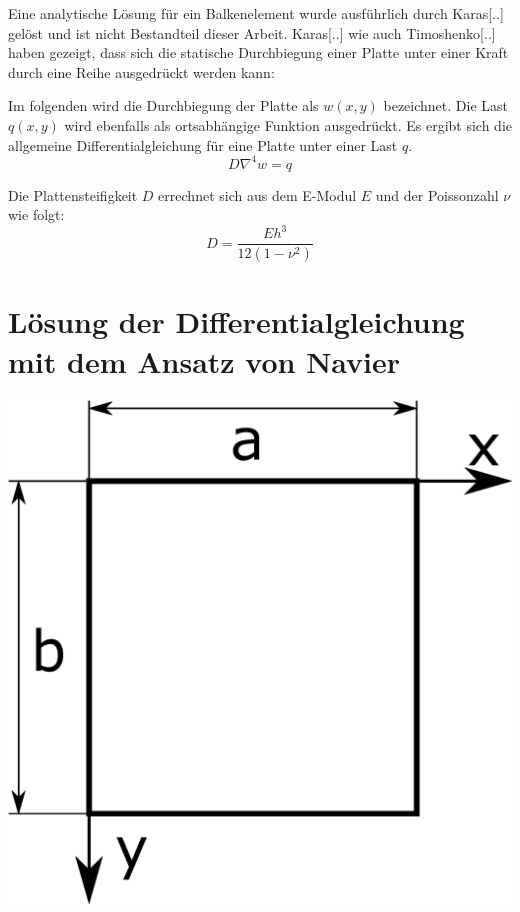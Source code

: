 Eine analytische Lösung für ein Balkenelement wurde ausführlich durch Karas[..] gelöst und ist nicht Bestandteil dieser Arbeit.
Karas[..] wie auch Timoshenko[..] haben gezeigt, dass sich die statische Durchbiegung einer Platte unter einer Kraft durch eine Reihe ausgedrückt werden kann:

Im folgenden wird die Durchbiegung der Platte als $w(x,y)$ bezeichnet. Die Last $q(x,y)$ wird ebenfalls als ortsabhängige Funktion ausgedrückt. 
Es ergibt sich die allgemeine Differentialgleichung für eine Platte unter einer Last $q$.
\begin{equation}
	D \nabla^4 w = q
\end{equation}

Die Plattensteifigkeit $D$ errechnet sich aus dem E-Modul $E$ und der Poissonzahl $\nu$ wie folgt:
\begin{equation}
D = \dfrac{E h^3}{12 (1-\nu^2)}
\end{equation}


\section{Lösung der Differentialgleichung mit dem Ansatz von Navier}

\begin{center}
	\includegraphics[scale=0.2]{pictures/theory/theory1.eps}
\end{center}

